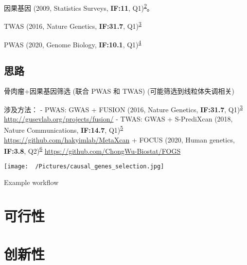 \documentclass[
]{article}
\begin{document}
因果基因 (2009, Statistics Surveys, \textbf{IF:11}, Q1)\textsuperscript{\protect\hyperlink{ref-CausalInferencPearl2009}{2}}。

TWAS (2016, Nature Genetics, \textbf{IF:31.7}, Q1)\textsuperscript{\protect\hyperlink{ref-IntegrativeAppGusev2016}{3}}

PWAS (2020, Genome Biology, \textbf{IF:10.1}, Q1)\textsuperscript{\protect\hyperlink{ref-PwasProteomeBrande2020}{4}}

\hypertarget{introduction}{%
\subsection{思路}\label{introduction}}

骨肉瘤+因果基因筛选 (联合 PWAS 和 TWAS) (可能筛选到线粒体失调相关)

涉及方法：
- PWAS: GWAS + FUSION (2016, Nature Genetics, \textbf{IF:31.7}, Q1)\textsuperscript{\protect\hyperlink{ref-IntegrativeAppGusev2016}{3}} \url{http://gusevlab.org/projects/fusion/}
- TWAS: GWAS + S-PrediXcan (2018, Nature Communications, \textbf{IF:14.7}, Q1)\textsuperscript{\protect\hyperlink{ref-ExploringThePBarbei2018}{5}} \url{https://github.com/hakyimlab/MetaXcan}
+ FOCUS (2020, Human genetics, \textbf{IF:3.8}, Q2)\textsuperscript{\protect\hyperlink{ref-APowerfulFineWuCh2020}{6}} \url{https://github.com/ChongWu-Biostat/FOGS}

\begin{center}\vspace{1.5cm}\end{center}
\def\@captype{figure}
\begin{center}
\texttt{[image: ~/Pictures/causal\_genes\_selection.jpg]}
\caption{Example workflow}\label{fig:example-workflow}
\end{center}

\begin{center}\vspace{1.5cm}\end{center}

\hypertarget{methods}{%
\section{可行性}\label{methods}}

\hypertarget{results}{%
\section{创新性}\label{results}}
\end{document}
